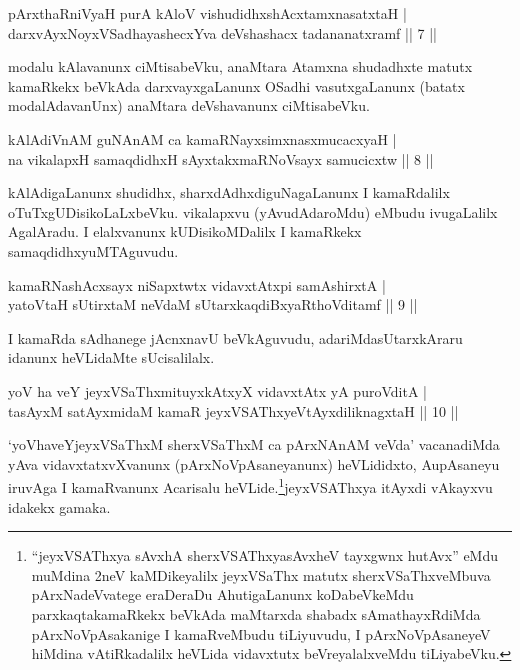 
\begin{shl}
pArxthaRniVyaH purA kAloV vishudidhxshAcx\s \s tamxnasatxtaH | \\
darxvAyxNoyxVSadhayashecxYva deVshashacx tadananatxramf \hfill|| 7 || 
\end{shl}

\begin{artha}
modalu kAlavanunx ciMtisabeVku, anaMtara Atamxna shudadhxte matutx kamaRkekx beVkAda darxvayxgaLanunx OSadhi vasutxgaLanunx (batatx modalAdavanUnx) anaMtara deVshavanunx ciMtisabeVku.
\end{artha}

\begin{shl}
kAlAdiVnAM guNAnAM ca kamaRNayxsimxnasxmucacxyaH | \\
na vikalapxH samaqdidhxH sAyxtakxmaRNoV\s sayx samucicxtw \hfill|| 8 || 
\end{shl}

\begin{artha}
kAlAdigaLanunx shudidhx, sharxdAdhxdiguNagaLanunx I kamaRdalilx oTuTxgUDisikoLaLxbeVku. vikalapxvu (yAvudAdaroMdu) eMbudu ivugaLalilx AgalAradu. I elalxvanunx kUDisikoMDalilx I kamaRkekx samaqdidhxyuMTAguvudu.
\end{artha}


\begin{shl}
kamaRNashAcxsayx niSapxtwtx vidavxtAtx\s pi samAshirxtA | \\
yatoV\s taH sUtirxtaM neVdaM sUtarxkaqdiBxyaRthoVditamf \hfill|| 9 || 
\end{shl}

\begin{artha}
I kamaRda sAdhanege jAcnxnavU beVkAguvudu, adariMda\break sUtarxkAraru idanunx heVLidaMte sUcisalilalx.
\end{artha}

\begin{shl}
yoV ha veY jeyxVSaThxmituyxkAtxyX vidavxtAtx yA puroVditA | \\
tasAyxM satAyxmidaM kamaR jeyxVSAThxyeVtAyxdiliknagxtaH \hfill|| 10 || 
\end{shl}

\begin{artha}
`yoVhaveYjeyxVSaThxM sherxVSaThxM ca pArxNAnAM veVda' vacanadiMda yAva vidavxtatxvXvanunx (pArxNoVpAsaneyanunx) heVLididxto, A\break upAsaneyu iruvAga I kamaRvanunx Acarisalu heVLide.\break \footnote{``jeyxVSAThxya sAvxhA sherxVSAThxyasAvxheV tayxgwnx hutAvx'' eMdu muMdina 2neV kaMDikeyalilx jeyxVSaThx matutx sherxVSaThxveMbuva pArxNadeVvatege eraDeraDu AhutigaLanunx koDabeVkeMdu parxkaqtakamaRkekx beVkAda maMtarxda shabadx sAmathayxRdiMda pArxNoVpAsakanige I kamaRveMbudu tiLiyuvudu, I pArxNoVpAsaneyeV hiMdina vAtiRkadalilx heVLida vidavxtutx beVreyalalxveMdu tiLiyabeVku.}jeyxVSAThxya itAyxdi vAkayxvu idakekx gamaka.
\end{artha}


